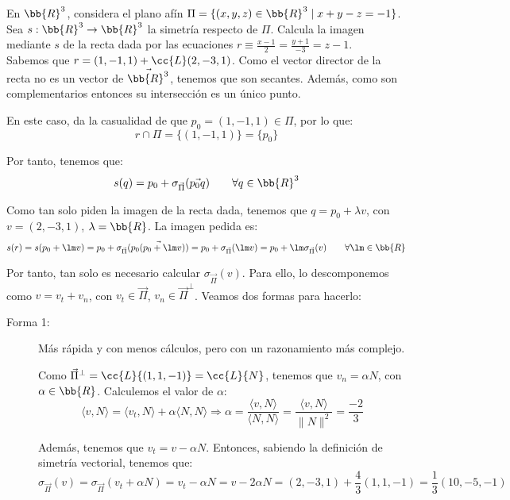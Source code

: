 \begin{ejercicio}
    En $\bb{R}^3$, considera el plano afín $\Pi = \{(x, y, z) \in \bb{R}^3 \mid x + y - z = -1\}$. Sea $s : \bb{R}^3 \to \bb{R}^3$ la simetría respecto de $\Pi$. Calcula la imagen mediante $s$ de la recta dada por las ecuaciones $r\equiv \frac{x-1}{2} =\frac{y+1}{-3} = z - 1$.\\

    Sabemos que $r=(1,-1,1)+\cc{L}(2, -3, 1)$. Como el vector director de la recta no es un vector de $\vec{\bb{R}^3}$, tenemos que son secantes. Además, como son complementarios entonces su intersección es un único punto.
    
    En este caso, da la casualidad de que $p_0 = (1, -1, 1)\in \Pi$, por lo que: $$r\cap \Pi = \{(1,-1,1)\} = \{p_0\}$$

    Por tanto, tenemos que:
    \begin{equation*}
        s(q) = p_0 + \sigma_{\vec{\Pi}}(\vec{p_0q}) \qquad \forall q\in \bb{R}^3
    \end{equation*}

    Como tan solo piden la imagen de la recta dada, tenemos que $q=p_0+\lambda v$, con $v=(2,-3,1)$, $\lambda=\bb{R}$. La imagen pedida es:
    \begin{equation*}
        s(r) = s(p_0+\lm v) = p_0 + \sigma_{\vec{\Pi}}(\vec{p_0(p_0+\lm v)})
        = p_0 + \sigma_{\vec{\Pi}}(\lm v) = p_0 + \lm \sigma_{\vec{\Pi}}(v)
        \qquad \forall \lm \in \bb{R}
    \end{equation*}

    Por tanto, tan solo es necesario calcular $\sigma_{\vec{\Pi}}(v)$. Para ello, lo descomponemos como $v=v_t+v_n$, con $v_t\in \vec{\Pi}$, $v_n\in \vec{\Pi}^\perp$. Veamos dos formas para hacerlo:
    \begin{description}
        \item[Forma 1:] Más rápida y con menos cálculos, pero con un razonamiento más complejo.

        Como $\vec{\Pi}^\perp = \cc{L}\{(1,1,-1)\} = \cc{L}\{N\}$, tenemos que $v_n = \alpha N$, con $\alpha\in \bb{R}$. Calculemos el valor de $\alpha$:
        \begin{equation*}
            \langle v,N\rangle = \langle v_t,N\rangle + \alpha\langle N,N\rangle \Longrightarrow \alpha = \frac{\langle v,N\rangle}{\langle N,N\rangle} = \frac{\langle v,N\rangle}{\|N\|^2} = \frac{-2}{3}
        \end{equation*}
        
        Además, tenemos que $v_t = v-\alpha N$. Entonces, sabiendo la definición de simetría vectorial, tenemos que:
        \begin{equation*}
            \sigma_{\vec{\Pi}}(v) = \sigma_{\vec{\Pi}}(v_t + \alpha N) = v_t - \alpha N = v-2\alpha N
            = (2,-3,1) + \frac{4}{3}(1,1,-1) = \frac{1}{3}(10,-5,-1)
        \end{equation*}


\end{description}
\end{ejercicio}

